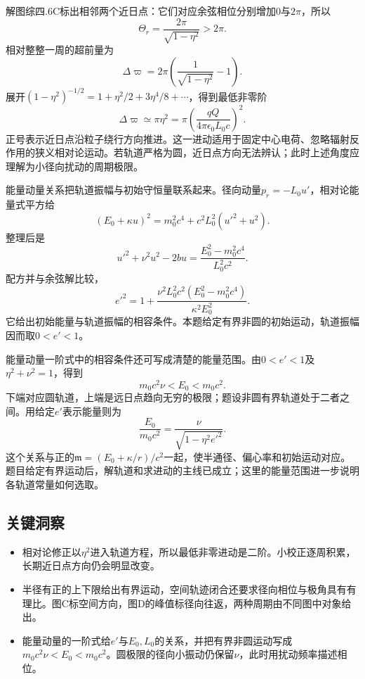 \documentclass[UTF8,fontset=fandol,a4paper,11pt]{ctexart}
\begin{document}
解图综四.6C标出相邻两个近日点：它们对应余弦相位分别增加$0$与$2\pi$，所以
\[
\boxed{\Theta_r=\frac{2\pi}{\sqrt{1-\eta^2}}>2\pi}.
\]
相对整整一周的超前量为
\[
\boxed{\Delta\varpi=
2\pi\left(\frac1{\sqrt{1-\eta^2}}-1\right)}.
\]
展开$(1-\eta^2)^{-1/2}=1+\eta^2/2+3\eta^4/8+\cdots$，得到最低非零阶
\[
\boxed{\Delta\varpi\simeq\pi\eta^2
=\pi\left(\frac{qQ}{4\pi\epsilon_0L_0c}\right)^2}.
\]
正号表示近日点沿粒子绕行方向推进。这一进动适用于固定中心电荷、忽略辐射反作用的狭义相对论运动。若轨道严格为圆，近日点方向无法辨认；此时上述角度应理解为小径向扰动的周期极限。

能量动量关系把轨道振幅与初始守恒量联系起来。径向动量$p_r=-L_0u'$，相对论能量式平方给
\[
(E_0+\kappa u)^2
=m_0^2c^4+c^2L_0^2(u'^2+u^2).
\]
整理后是
\[
u'^2+\nu^2u^2-2bu
=\frac{E_0^2-m_0^2c^4}{L_0^2c^2}.
\]
配方并与余弦解比较，
\[
e'^2=1+
\frac{\nu^2L_0^2c^2(E_0^2-m_0^2c^4)}{\kappa^2E_0^2}.
\]
它给出初始能量与轨道振幅的相容条件。本题给定有界非圆的初始运动，轨道振幅因而取$0<e'<1$。

能量动量一阶式中的相容条件还可写成清楚的能量范围。由$0<e'<1$及$\eta^2+\nu^2=1$，得到
\[
m_0c^2\nu<E_0<m_0c^2.
\]
下端对应圆轨道，上端是远日点趋向无穷的极限；题设非圆有界轨道处于二者之间。用给定$e'$表示能量则为
\[
\frac{E_0}{m_0c^2}=\frac{\nu}{\sqrt{1-\eta^2e'^2}}.
\]
这个关系与正的$\mathfrak m=(E_0+\kappa/r)/c^2$一起，使半通径、偏心率和初始运动对应。题目给定有界运动后，解轨道和求进动的主线已成立；这里的能量范围进一步说明各轨道常量如何选取。




\subsection*{关键洞察}

\begin{itemize}
\item 相对论修正以$\eta^2$进入轨道方程，所以最低非零进动是二阶。小校正逐周积累，长期近日点方向仍会明显改变。
\item 半径有正的上下限给出有界运动，空间轨迹闭合还要求径向相位与极角具有有理比。图C标空间方向，图D的峰值标径向往返，两种周期由不同图中对象给出。
\item 能量动量的一阶式给$e'$与$E_0,L_0$的关系，并把有界非圆运动写成$m_0c^2\nu<E_0<m_0c^2$。圆极限的径向小振动仍保留$\nu$，此时用扰动频率描述相位。
\end{itemize}

\end{document}
